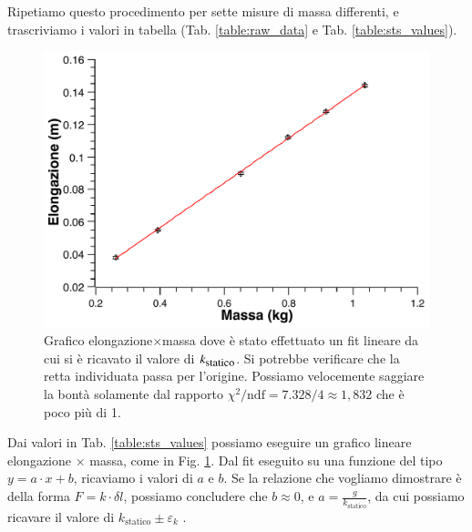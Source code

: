 \documentclass[italian, a4paper, 10pt, twocolumn]{../../style/lab_unige}
\newcommand{\reftab}[1]{Tab. {\ref{#1}}}%
\newcommand{\reffig}[1]{Fig. {\ref{#1}}}%
\newcommand{\ks}{$k_{\text{\small statico}}$\space}
\newcommand{\ChiNdf}{$\chi^2/\text{ndf}$\space}
\newcommand{\hookeLaw}{$F=k\cdot\delta l$\space}
\newcommand{\misuraIncertezaUM}[3]{$#1\pm#2$ #3}
\begin{document}
    Ripetiamo questo procedimento per sette misure di massa differenti, e trascriviamo i valori in tabella 
    (\reftab{table:raw_data} e \reftab{table:sts_values}).\\ %

    \begin{figure}
        \centering
        \includegraphics[width=\linewidth]{plot_sts.pdf}
        \caption{Grafico elongazione$\times$massa dove è stato effettuato un fit lineare da cui si è ricavato il 
        valore di \ks. Si potrebbe verificare che la retta individuata passa per l'origine. Possiamo velocemente 
        saggiare la bontà solamente dal rapporto \ChiNdf$=7.328/4\approx1,832$ che è poco più di 1.}
        \label{figure:plot_sts}
    \end{figure}

    Dai valori in \reftab{table:sts_values} possiamo eseguire un grafico lineare elongazione $\times$ massa, come
    in \reffig{figure:plot_sts}. 
    Dal fit eseguito su una funzione del tipo $y=a\cdot x + b$, ricaviamo i valori di $a$ e $b$. Se la relazione 
    che vogliamo dimostrare è della forma \hookeLaw, possiamo concludere che $b\approx0$, e
    $a=\frac{g}{k_{\text{statico}}}$, da cui possiamo ricavare il valore di 
    \misuraIncertezaUM{k_{\text{statico}}}{\varepsilon_k}{}.

    
\end{document}
